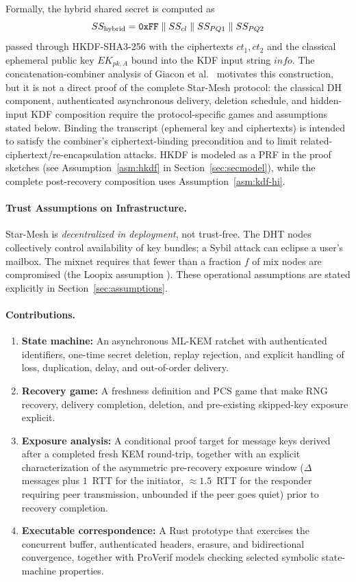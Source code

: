\documentclass[11pt,a4paper]{article}
\theoremstyle{remark}
\theoremstyle{plain}
\newcommand{\hexlit}[1]{\text{\upshape\texttt{#1}}}
\begin{document}
Formally, the hybrid shared secret is computed as
\[
  SS_{\text{hybrid}} = \hexlit{0xFF} \;\|\; SS_{cl} \;\|\; SS_{PQ1} \;\|\; SS_{PQ2}
\]
passed through HKDF-SHA3-256 with the ciphertexts $ct_1, ct_2$ and the classical ephemeral public key $EK_{pk,A}$ bound into the KDF input string $info$. The concatenation-combiner analysis of Giacon et al.\ \cite{giacon2018kem} motivates this construction, but it is not a direct proof of the complete Star-Mesh protocol: the classical DH component, authenticated asynchronous delivery, deletion schedule, and hidden-input KDF composition require the protocol-specific games and assumptions stated below. Binding the transcript (ephemeral key and ciphertexts) is intended to satisfy the combiner's ciphertext-binding precondition and to limit related-ciphertext/re-encapsulation attacks. HKDF is modeled as a PRF in the proof sketches (see Assumption~\ref{asm:hkdf} in Section~\ref{sec:secmodel}), while the complete post-recovery composition uses Assumption~\ref{asm:kdf-hi}.

\paragraph{Trust Assumptions on Infrastructure.}
Star-Mesh is \emph{decentralized in deployment}, not trust-free.  The DHT nodes collectively
control availability of key bundles; a Sybil attack can eclipse a user's mailbox.  The mixnet
requires that fewer than a fraction $f$ of mix nodes are compromised (the Loopix assumption
\cite{loopix}).  These operational assumptions are stated explicitly in
Section~\ref{sec:assumptions}.

\paragraph{Contributions.}
\begin{enumerate}
  \item \textbf{State machine:} An asynchronous ML-KEM ratchet with authenticated identifiers,
        one-time secret deletion, replay rejection, and explicit handling of loss, duplication,
        delay, and out-of-order delivery.
  \item \textbf{Recovery game:} A freshness definition and PCS game that make RNG recovery,
        delivery completion, deletion, and pre-existing skipped-key exposure explicit.
  \item \textbf{Exposure analysis:} A conditional proof target for message keys derived after a
        completed fresh KEM round-trip, together with an explicit characterization of the asymmetric
        pre-recovery exposure window ($\Delta$ messages plus $1$~RTT for the initiator, $\approx 1.5$~RTT
        for the responder requiring peer transmission, unbounded if the peer goes quiet) prior to recovery completion.
  \item \textbf{Executable correspondence:} A Rust prototype that exercises the concurrent
        buffer, authenticated headers, erasure, and bidirectional convergence, together with
        ProVerif models checking selected symbolic state-machine properties.
\end{enumerate}
\end{document}
